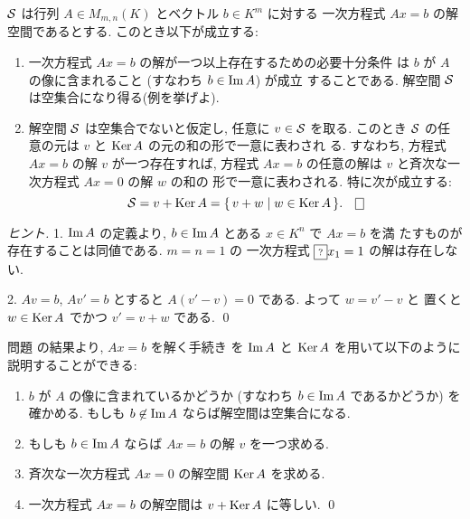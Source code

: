 \documentclass[12pt,twoside]{jarticle}
\begin{document}
\begin{question}
  \label{q:KerA-ImageA}
  ${\mathcal S}$ は行列 $A\in M_{m,n}(K)$ とベクトル $b\in K^m$ に対する
  一次方程式 $Ax=b$ の解空間であるとする.  このとき以下が成立する:
  \begin{enumerate}
  \item 一次方程式 $Ax=b$ の解が一つ以上存在するための必要十分条件
    は $b$ が $A$ の像に含まれること (すなわち $b\in\mathop{\mathrm{Im}}\nolimits A$) が成立
    することである. 
    解空間 ${\mathcal S}$ は空集合になり得る(例を挙げよ).
  \item 解空間 ${\mathcal S}$ は空集合でないと仮定し, 任意に $v\in {\mathcal S}$ を取る.
    このとき ${\mathcal S}$ の任意の元は $v$ と $\mathop{\mathrm{Ker}}\nolimits A$ の元の和の形で一意に表わされ
    る. すなわち, 方程式 $Ax=b$ の解 $v$ が一つ存在すれば, 
    方程式 $Ax=b$ の任意の解は $v$ と斉次な一次方程式 $Ax=0$ の解 $w$ の和の
    形で一意に表わされる.  特に次が成立する:
    \begin{equation*}
      \cS = v + \Ker A = \{\, v + w \mid w \in \Ker A \,\}.
      \qed
    \end{equation*}
  \end{enumerate}
\end{question}

\begin{proof}[ヒント]
  1. $\mathop{\mathrm{Im}}\nolimits A$ の定義より, $b\in\mathop{\mathrm{Im}}\nolimits A$ とある $x\in K^n$ で $Ax=b$ を満
  たすものが存在することは同値である.  $m=n=1$ の
  一次方程式 $\fbox{\text{\scriptsize ?}}x_1=1$ の解は存在しない.

  2. $Av=b$, $Av'=b$ とすると $A(v'-v)=0$ である. よって $w=v'-v$ と
  置くと $w\in\mathop{\mathrm{Ker}}\nolimits A$ でかつ $v'=v+w$ である. 
  \qed
\end{proof}

\begin{rem}
  問題  の結果より, $Ax=b$ を解く手続き
  を $\mathop{\mathrm{Im}}\nolimits A$ と $\mathop{\mathrm{Ker}}\nolimits A$ を用いて以下のように説明することができる:
  \begin{enumerate}
  \item $b$ が $A$ の像に含まれているかどうか 
    (すなわち $b\in\mathop{\mathrm{Im}}\nolimits A$ であるかどうか) 
    を確かめる.  もしも $b\not\in\mathop{\mathrm{Im}}\nolimits A$ ならば解空間は空集合になる.
  \item もしも $b\in\mathop{\mathrm{Im}}\nolimits A$ ならば $Ax=b$ の解 $v$ を一つ求める.
  \item 斉次な一次方程式 $Ax=0$ の解空間 $\mathop{\mathrm{Ker}}\nolimits A$ を求める.
  \item 一次方程式 $Ax=b$ の解空間は $v+\mathop{\mathrm{Ker}}\nolimits A$ に等しい.
    \qed
  \end{enumerate}
\end{rem}
\end{document}
